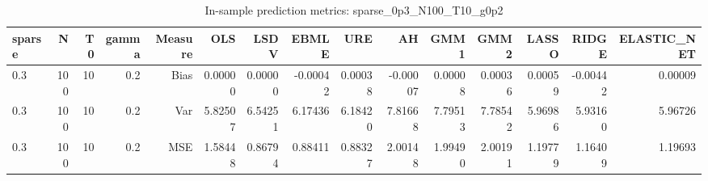 \begin{table}[!htbp]\centering
\caption{In-sample prediction metrics: sparse_0p3_N100_T10_g0p2}
\label{tab:table2_sparse_0p3_N100_T10_g0p2}
\begin{tabular}{lrrrrrrrrrrrrrr}
\hline
sparse & N & T0 & gamma & Measure & OLS & LSDV & EBMLE & URE & AH & GMM1 & GMM2 & LASSO & RIDGE & ELASTIC_NET \\
\hline
0.3 & 100 & 10 & 0.2 & Bias & 0.00000 & 0.00000 & -0.00042 & 0.00038 & -0.00007 & 0.00008 & 0.00036 & 0.00059 & -0.00442 & 0.00009 \\
0.3 & 100 & 10 & 0.2 & Var & 5.82507 & 6.54251 & 6.17436 & 6.18420 & 7.81668 & 7.79513 & 7.78542 & 5.96986 & 5.93160 & 5.96726 \\
0.3 & 100 & 10 & 0.2 & MSE & 1.58448 & 0.86794 & 0.88411 & 0.88327 & 2.00148 & 1.99490 & 2.00191 & 1.19779 & 1.16409 & 1.19693 \\
\hline
\end{tabular}
\end{table}

